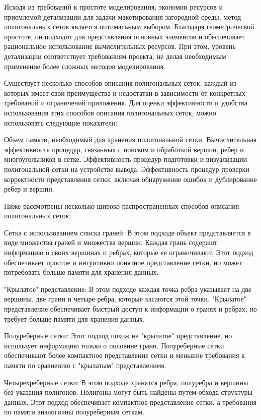 Исходя из требований к простоте моделирования, экономии ресурсов и приемлемой детализации для задачи макетирования загородной среды, метод полигональных сеток является оптимальным выбором. Благодаря геометрической простоте, он подходит для представления основных элементов и обеспечивает рациональное использование вычислительных ресурсов. При этом, уровень детализации соответствует требованиям проекта, не делая необходимым применение более сложных методов моделирования.



Существует несколько способов описания полигональных сеток, каждый из которых имеет свои преимущества и недостатки в зависимости от конкретных требований и ограничений приложения. Для оценки эффективности и удобства использования этих способов описания полигональных сеток, можно использовать следующие показатели:

    Объем памяти, необходимый для хранения полигональной сетки.
    Вычислительная эффективность процедур, связанных с поиском и обработкой вершин, ребер и многоугольников в сетке.
    Эффективность процедур подготовки и визуализации полигональной сетки на устройстве вывода.
    Эффективность процедур проверки корректности представления сетки, включая обнаружение ошибок и дублирование ребер и вершин.

Ниже рассмотрены несколько широко распространенных способов описания полигональных сеток:

    Сетка с использованием списка граней: В этом подходе объект представляется в виде множества граней и множества вершин. Каждая грань содержит информацию о своих вершинах и ребрах, которые ее ограничивают. Этот подход обеспечивает простое и интуитивно понятное представление сетки, но может потребовать больше памяти для хранения данных.

    "Крылатое" представление: В этом подходе каждая точка ребра указывает на две вершины, две грани и четыре ребра, которые касаются этой точки. "Крылатое" представление обеспечивает быстрый доступ к информации о гранях и ребрах, но требует больше памяти для хранения данных.

    Полуреберные сетки: Этот подход похож на "крылатое" представление, но использует информацию только о половине грани. Полуреберные сетки обеспечивают более компактное представление сетки и меньшие требования к памяти по сравнению с "крылатым" представлением.

    Четырехреберные сетки: В этом подходе хранятся ребра, полуребра и вершины без указания полигонов. Полигоны могут быть найдены путем обхода структуры данных. Этот подход обеспечивает компактное представление сетки, а требования по памяти аналогичны полуреберным сеткам.

